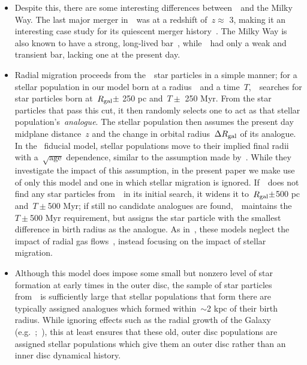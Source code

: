 \documentclass[ms.tex]{subfiles}
\begin{document}
\begin{itemize}
	\item Despite this, there are some interesting differences 
	between~\hsim~and the Milky Way. 
	The last major merger in~\hsim~was at a redshift of~$z \approx$ 3, making 
	it an interesting case study for its quiescent merger 
	history~\citep[e.g.][]{Zolotov2012}. 
	The Milky Way is also known to have a strong, long-lived 
	bar~\citep[e.g.][]{Bovy2019}, while~\hsim~had only a weak and transient 
	bar, lacking one at the present day. 

	\item Radial migration proceeds from the~\hsim~star particles in a simple 
	manner; for a stellar population in our model born at a radius~\rgal~and a 
	time~$T$,~\vice~searches for star particles born at~$R_\text{gal} \pm$ 250 pc 
	and~$T \pm$ 250 Myr. 
	From the star particles that pass this cut, it then randomly selects one 
	to act as that stellar population's~\textit{analogue}. 
	The stellar population then assumes the present day midplane distance~$z$ 
	and the change in orbital radius~$\Delta R_\text{gal}$ of its analogue. 
	In the~\citet{Johnson2021} fiducial model, stellar populations move to 
	their implied final radii with a~$\sqrt{\text{age}}$ dependence, similar 
	to the assumption made by~\citet{Frankel2018, Frankel2019}. 
	While they investigate the impact of this assumption, in the present paper 
	we make use of only this model and one in which stellar migration is 
	ignored. 
	If~\vice~does not find any star particles from~\hsim~in its initial search, 
	it widens it to~$R_\text{gal} \pm$500 pc and~$T \pm$500 Myr; if still no 
	candidate analogues are found,~\vice~maintains the~$T \pm$500 Myr 
	requirement, but assigns the star particle with the smallest difference in 
	birth radius as the analogue. 
	As in~\citet{Johnson2021}, these models neglect the impact of radial 
	gas flows~\citep[e.g.][]{Lacey1985, Bilitewski2012, Vincenzo2020}, instead 
	focusing on the impact of stellar migration. 

	\item Although this model does impose some small but nonzero level of star 
	formation at early times in the outer disc, the sample of star particles 
	from~\hsim~is sufficiently large that stellar populations that form there 
	are typically assigned analogues which formed within~$\sim$2 kpc of their 
	birth radius. 
	While ignoring effects such as the radial growth of the Galaxy 
	(e.g.~\citealp*{Bird2012};~\citealp{Bird2013}), this at least ensures that 
	these old, outer disc populations are assigned stellar populations which 
	give them an outer disc rather than an inner disc dynamical history. 


\end{itemize}
\end{document}
